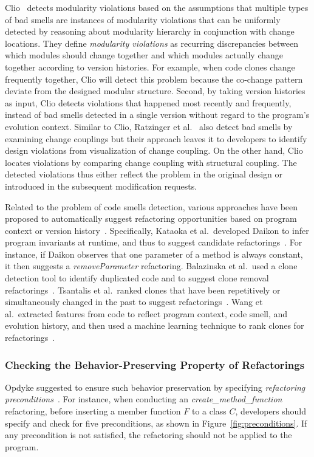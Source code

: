 \documentclass[runningheads,a4paper]{llncs}
\begin{document}
Clio~\cite{Wong2011:cleo} detects modularity violations based on the assumptions that multiple types of bad smells are instances of modularity violations that can be uniformly detected by reasoning about modularity hierarchy in conjunction with change locations.  They define {\em modularity violations} as recurring discrepancies between which modules should change together and which modules actually change together according to version histories. For example, when code clones change frequently together, Clio will detect this problem because the co-change pattern deviate from the designed modular structure. Second, by taking version histories as input, Clio detects violations that happened most recently and frequently, instead of bad smells detected in a single version without regard to the program's evolution context. Similar to Clio, Ratzinger et al.~\cite{ratzinger:msr05} also detect bad smells by examining change couplings but their approach leaves it to developers to identify design violations from visualization of change coupling. On the other hand, Clio locates violations by comparing change coupling with structural coupling. The detected violations thus either reflect the problem in the original design or introduced in the subsequent modification requests.

Related to the problem of code smells detection, various approaches have been proposed to automatically suggest refactoring opportunities based on program context or version history~\cite{Balazinska2000:ACA,Kataoka2001:ASP,Higo2008:metricrefactoring,Tsantalis2011:rankRefactoring,Wang2014:recommendClones,Meng2015:ARO}. Specifically, Kataoka et al.~developed Daikon to infer program invariants at runtime, and thus to suggest candidate refactorings~\cite{Kataoka2001:ASP}. For instance, if Daikon observes that one parameter of a method is always constant, it then suggests a \emph{removeParameter} refactoring. Balazinska et al.~used a clone detection tool to identify duplicated code and to suggest clone removal refactorings~\cite{Balazinska2000:ACA}. Tsantalis et al.~ranked clones that have been repetitively or simultaneously changed in the past to suggest refactorings~\cite{Tsantalis2011:rankRefactoring}. Wang et al.~extracted features from code to reflect program context, code smell, and evolution history, and then used a machine learning technique to rank clones for refactorings~\cite{Wang2014:recommendClones}.

\subsubsection{Checking the Behavior-Preserving Property of Refactorings}Opdyke suggested to ensure such behavior preservation by specifying \emph{refactoring preconditions}~\cite{Opdyke1992:ROF}. For instance, when conducting an \emph{create\_method\_function} refactoring, before inserting a member function $F$ to a class $C$, developers should specify and check for five preconditions, as shown in Figure~\ref{fig:preconditions}. If any precondition is not satisfied, the refactoring should not be applied to the program.
\end{document}
